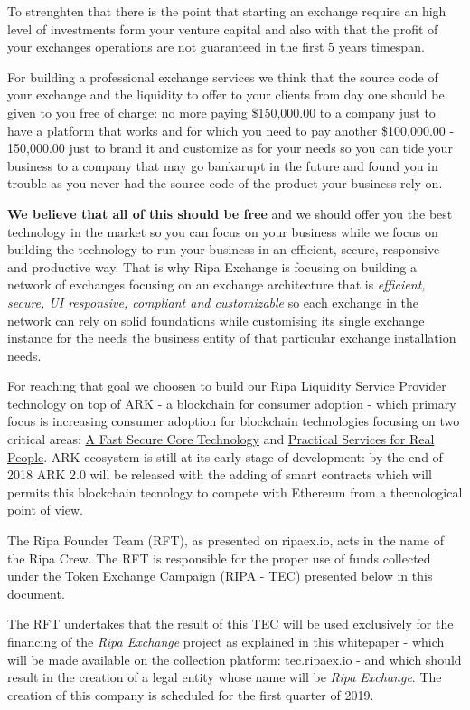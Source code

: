 \documentclass[11pt,fleqn,oneside]{book} %
\begin{document}
To strenghten that there is the point that starting an exchange require an high level of investments form your venture capital 
and also with that the profit of your exchanges operations are not guaranteed in the first 5 years timespan.

For building a professional exchange services we think that the source code of your exchange and the liquidity to offer to your clients
from day one should be given to you free of charge: no more paying \$150,000.00 to a company just to have a platform that works and for
which you need to pay another \$100,000.00 - 150,000.00 just to brand it and customize as for your needs so you can tide your 
business to a company that may go bankarupt in the future and found you in trouble as you never had the source code of the product
your business rely on.

\textbf{We believe that all of this should be free} and we should offer you the best technology in the market so you can focus on your business
while we focus on building the technology to run your business in an efficient, secure, responsive and productive way. That is why Ripa Exchange 
is focusing on building a network of exchanges focusing on an exchange architecture that is \textit{efficient, secure, UI responsive, compliant and customizable}
so each exchange in the network can rely on solid foundations while customising its single exchange instance for the needs 
the business entity of that particular exchange installation needs.

For reaching that goal we choosen to build our Ripa Liquidity Service Provider technology on top of ARK - a blockchain for consumer adoption - 
which primary focus is increasing consumer adoption for blockchain technologies focusing on two critical areas: \underline{A Fast Secure Core Technology}
and \underline{Practical Services for Real People}. ARK ecosystem is still at its early stage of development: by the end of 2018 ARK 2.0
will be released with the adding of smart contracts which will permits this blockchain tecnology to compete with Ethereum from a thecnological 
point of view.

The Ripa Founder Team (RFT), as presented on ripaex.io, acts in the name of the Ripa Crew. The RFT is responsible for the proper use of 
funds collected under the Token Exchange Campaign (RIPA - TEC) presented below in this document.

The RFT undertakes that the result of this TEC will be used exclusively for the financing of the \emph{Ripa Exchange} project as explained in this 
whitepaper - which will be made available on the collection platform: tec.ripaex.io - and which should result in the creation of a 
legal entity whose name will be \emph{Ripa Exchange}. The creation of this company is scheduled for the first quarter of 2019.
\end{document}
